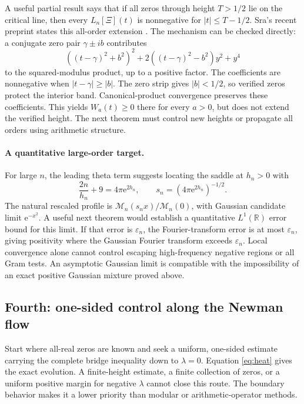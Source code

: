 \documentclass[11pt,letterpaper]{article}
\numberwithin{equation}{section}
\theoremstyle{remark}\newtheorem{remark}[proposition]{Remark}
\newcommand{\R}{\mathbb R}
\newcommand{\calM}{\mathcal M}
\newcommand{\ee}{\mathrm e}
\begin{document}
A useful partial result says that if all zeros through height $T>1/2$ lie on the critical line, then every $L_n[\Xi](t)$ is nonnegative for $|t|\le T-1/2$. Sra's recent preprint states this all-order extension \cite{sra}. The mechanism can be checked directly: a conjugate zero pair $\gamma\pm ib$ contributes
\[
 ((t-\gamma)^2+b^2)^2
 +2((t-\gamma)^2-b^2)y^2+y^4
\]
to the squared-modulus product, up to a positive factor. The coefficients are nonnegative when $|t-\gamma|\ge|b|$. The zero strip gives $|b|<1/2$, so verified zeros protect the interior band. Canonical-product convergence preserves these coefficients. This yields $W_a(t)\ge0$ there for every $a>0$, but does not extend the verified height. The next theorem must control new heights or propagate all orders using arithmetic structure.

\paragraph{A quantitative large-order target.}
For large $n$, the leading theta term suggests locating the saddle at $h_n>0$ with
\[
 \frac{2n}{h_n}+9=4\pi\ee^{2h_n},
 \qquad s_n=(4\pi\ee^{2h_n})^{-1/2}.
\]
The natural rescaled profile is
$\calM_n(s_nx)/\calM_n(0)$, with Gaussian candidate limit $\ee^{-x^2}$.
A useful next theorem would establish a quantitative $L^1(\R)$ error bound for this limit. If that error is $\varepsilon_n$, the Fourier-transform error is at most $\varepsilon_n$, giving positivity where the Gaussian Fourier transform exceeds $\varepsilon_n$. Local convergence alone cannot control escaping high-frequency negative regions or all Gram tests. An asymptotic Gaussian limit is compatible with the impossibility of an exact positive Gaussian mixture proved above.

\subsection{Fourth: one-sided control along the Newman flow}
Start where all-real zeros are known and seek a uniform, one-sided estimate carrying the complete bridge inequality down to $\lambda=0$. Equation \eqref{eq:heat} gives the exact evolution. A finite-height estimate, a finite collection of zeros, or a uniform positive margin for negative $\lambda$ cannot close this route. The boundary behavior makes it a lower priority than modular or arithmetic-operator methods.
\end{document}
